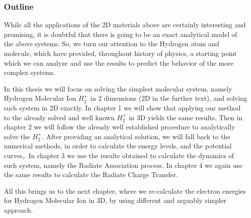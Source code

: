 \subsubsection{Outline}

While all the applications of the 2D materials above are certainly interesting and promising, it is doubtful that there is going to be an exact analytical model of the above systems. So, we turn our attention to the Hydrogen atom and molecule, which have provided, throughout history of physics, a starting point which we can analyze and use the results to predict the behavior of the more complex systems. 

In this thesis we will focus on solving the simplest molecular system, namely Hydrogen Molecular Ion $ {H_2^{+}}  $ in 2 dimensions (2D in the further text), and solving such system in 2D exactly.  In chapter 1 we will show that applying our method to the already solved and well known $ {H_2^{+}} $ in 3D yields the same results. Then in chapter 2 we will follow  the already well established procedure \cite{Bates1} to analytically solve the $ {H_2^{+}} $. After providing an analytical solution, we will fall back to the numerical methods, in order to calculate the energy levels, and the potential curves,. In chapter 3 we use the results obtained to calculate the dynamics of such system, namely the Radiate Association process. In chapter 4 we again use the same results to calculate the Radiate Charge Transfer. 

All this brings us to the next chapter, where we re-calculate the electron energies for Hydrogen Molecular Ion in 3D, by using different and arguably simpler approach.
